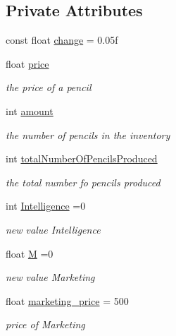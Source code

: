 \subsection*{Private Attributes}
\begin{DoxyCompactItemize}
\item 
const float \mbox{\hyperlink{classPencil__Inventory_a063e85195a84875c4b3f42c2f01ebdbd}{change}} = 0.\+05f
\item 
float \mbox{\hyperlink{classPencil__Inventory_a833632ab57afc00b148d106c43a6729e}{price}}
\begin{DoxyCompactList}\small\item\em the price of a pencil \end{DoxyCompactList}\item 
int \mbox{\hyperlink{classPencil__Inventory_a19f4ff72e64dbd5c5fbb1fd302b54c85}{amount}}
\begin{DoxyCompactList}\small\item\em the number of pencils in the inventory \end{DoxyCompactList}\item 
int \mbox{\hyperlink{classPencil__Inventory_ac7f37f56e5e1a630cf24e436aac27cee}{total\+Number\+Of\+Pencils\+Produced}}
\begin{DoxyCompactList}\small\item\em the total number fo pencils produced \end{DoxyCompactList}\item 
int \mbox{\hyperlink{classPencil__Inventory_aec57d3493d0b82f53e4f5690b7b215b3}{Intelligence}} =0
\begin{DoxyCompactList}\small\item\em new value Intelligence \end{DoxyCompactList}\item 
float \mbox{\hyperlink{classPencil__Inventory_a8902b0c57c4878e88e8b6a9672c7c74f}{M}} =0
\begin{DoxyCompactList}\small\item\em new value Marketing \end{DoxyCompactList}\item 
float \mbox{\hyperlink{classPencil__Inventory_a151aa3de51dde7a210471de26228e8aa}{marketing\+\_\+price}} = 500
\begin{DoxyCompactList}\small\item\em price of Marketing \end{DoxyCompactList}\end{DoxyCompactItemize}


